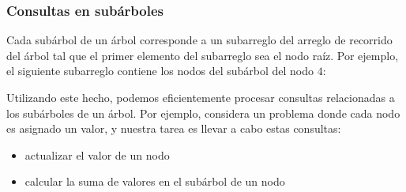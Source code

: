 \begin{center}
\end{center}

\subsubsection{Consultas en subárboles}

Cada subárbol de un árbol corresponde a un subarreglo del arreglo
de recorrido del árbol tal que el primer elemento del subarreglo
sea el nodo raíz. Por ejemplo, el siguiente subarreglo contiene
los nodos del subárbol del nodo $4$:
\begin{center}
\end{center}

Utilizando este hecho, podemos eficientemente procesar consultas
relacionadas a los subárboles de un árbol. Por ejemplo, considera
un problema donde cada nodo es asignado un valor, y nuestra tarea
es llevar a cabo estas consultas:
\begin{itemize}
    \item actualizar el valor de un nodo
    \item calcular la suma de valores en el subárbol de un nodo
\end{itemize}

